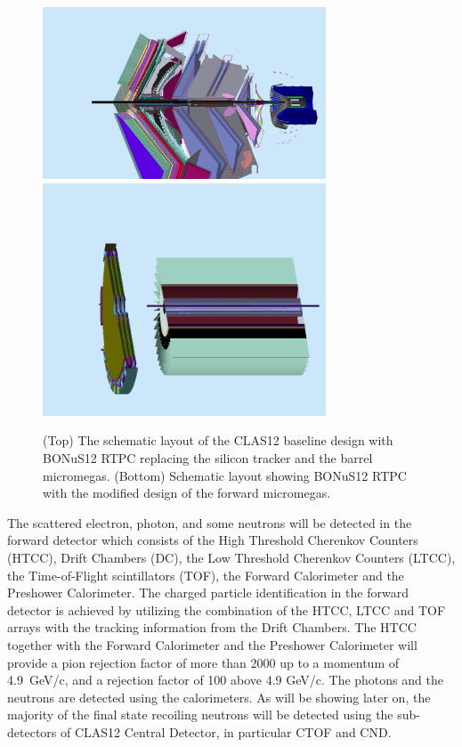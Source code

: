 \begin{figure}
  \begin{center}
    \includegraphics[angle=0, width=0.75\textwidth]{figures/clas12_bonus12.png}
    \includegraphics[angle=0, width=0.75\textwidth,clip, trim = 0mm 10mm 0mm 
     40mm]{figures/bonus12_fmt.png}
     \caption{(Top) The schematic layout of the CLAS12 baseline design with 
     BONuS12 RTPC replacing the silicon tracker and the barrel micromegas.  
     (Bottom) Schematic layout showing BONuS12 RTPC with the modified design of 
     the forward micromegas.}
    \label{fig:fd}
  \end{center}
\end{figure}


The scattered electron, photon, and some neutrons will be detected in the 
forward detector which consists of the High Threshold Cherenkov Counters 
(HTCC), Drift Chambers (DC), the Low Threshold Cherenkov Counters (LTCC), the 
Time-of-Flight scintillators (TOF), the Forward Calorimeter and the Preshower 
Calorimeter. The charged particle identification in the forward detector is 
achieved by utilizing the combination of the HTCC, LTCC and TOF arrays with the 
tracking information from the Drift Chambers. The HTCC together with the 
Forward Calorimeter and the Preshower Calorimeter will provide a pion rejection 
factor of more than 2000 up to a momentum of 4.9~GeV/c, and a rejection factor 
of 100 above 4.9 GeV/c. The photons and the neutrons are detected using the 
calorimeters. As will be showing later on, the majority of the final state 
recoiling neutrons will be detected using the sub-detectors of CLAS12 Central 
Detector, in particular CTOF and CND. 

